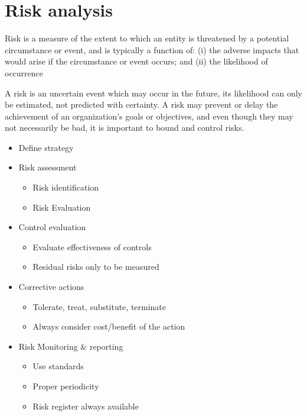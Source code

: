 \chapter{Risk analysis}

\begin{definition}
   [Risk]
   Risk is a measure of the extent to which an entity is threatened by a potential
circumstance or event, and is typically a function of: (i) the adverse impacts that
would arise if the circumstance or event occurs; and (ii) the likelihood of
occurrence

\end{definition}

A risk is an uncertain event which may occur in the future, its likelihood can only
be estimated, not predicted with certainty.
A risk may prevent or delay the achievement of an organization’s goals or objectives, and even though they may not necessarily be bad, it is important to bound and control risks.

\begin{enumerate}
\begin{itemize}
	\item Define strategy
	\item Risk assessment
	      \begin{itemize}
		      \item Risk identification
		      \item Risk Evaluation
	      \end{itemize}
	\item Control evaluation
	      \begin{itemize}
		      \item Evaluate effectiveness of controls
		      \item Residual risks only to be measured

	      \end{itemize}
	\item Corrective actions
	      \begin{itemize}
		      \item Tolerate, treat, substitute, terminate
		      \item Always consider cost/benefit of the action
	      \end{itemize}
	\item Risk Monitoring & reporting
	      \begin{itemize}
		      \item Use standards
		      \item Proper periodicity
		      \item Risk register always available
	      \end{itemize}
\end{itemize}
\end{enumerate}

